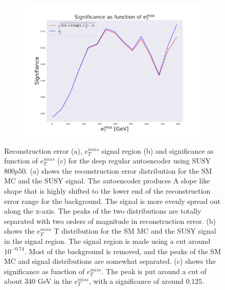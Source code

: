 \begin{figure}[H]
    \begin{subfigure}{.40\textwidth}
        \includegraphics[width=\textwidth]{Figures/AE_testing/big/2lep/significance_etmiss_800p0p050_-0.7416855615358031.pdf}
        \caption{}
        \label{fig:AE_2lep_big_signi_800_3}
    \end{subfigure}
    \hfill      
    \caption[2lep deep network | $800p50$ | AE | 3]{Reconstruction error (a), $e_T^{miss}$ signal region (b) and significance as function of 
    $e_T^{miss}$ (c) for the deep regular autoencoder using SUSY $800p50$. 
    (a) shows the reconstruction error distribution for the SM MC and the SUSY signal. 
    The autoencoder produces A slope like shape that is highly shifted to the lower end of the reconstruction error range
for the background. The signal is more evenly spread out along the x-axis. The peaks of the two distributions are totally separated
with two orders of magnitude in reconstruction error. (b) shows the $e_T^{miss}$
T distribution for the SM MC and the SUSY signal in the signal region. The signal region is made using a cut around
$10^{-0.74}$. Most of the background is removed, and the peaks of the SM MC and signal distributions are
somewhat separated. (c) shows the significance as function of $e_T^{miss}$. The peak is put 
around a cut of about 340 GeV in the $e_T^{miss}$, with a significance of around $0.125$.}
    \label{fig:AE_2lep_big_rec_sig_signi_800_3}
\end{figure}

